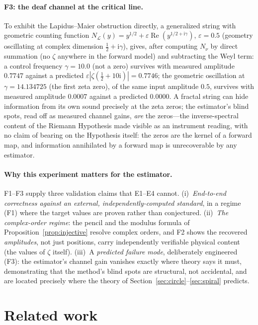 \documentclass[11pt, a4paper]{article}
\theoremstyle{definition}
\theoremstyle{remark}
\newcommand{\ii}{\mathrm{i}}
\begin{document}
\paragraph{F3: the deaf channel at the critical line.} To exhibit the
Lapidus--Maier obstruction directly, a generalized string with geometric
counting function
$N_{\mathcal{L}}(y)=y^{1/2}+\varepsilon\operatorname{Re}(y^{1/2+\ii\gamma})$,
$\varepsilon=0.5$ (geometry oscillating at complex dimension
$\tfrac12+\ii\gamma$), gives, after computing $N_\nu$ by direct summation
(no $\zeta$ anywhere in the forward model) and subtracting the Weyl term: a
control frequency $\gamma=10.0$ (not a zero) survives with measured
amplitude $0.7747$ against a predicted $\varepsilon|\zeta(\tfrac12+10\ii)|
=0.7746$; the geometric oscillation at $\gamma=14.134725$ (the first zeta
zero), of the same input amplitude $0.5$, survives with measured amplitude
$\mathbf{0.0007}$ against a predicted $0.0000$. A fractal string can hide
information from its own sound precisely at the zeta zeros; the
estimator's blind spots, read off as measured channel gains, \emph{are}
the zeros---the inverse-spectral content of the Riemann Hypothesis made
visible as an instrument reading, with no claim of bearing on the
Hypothesis itself: the zeros are the kernel of a forward map, and
information annihilated by a forward map is unrecoverable by any
estimator.

\paragraph{Why this experiment matters for the estimator.} F1--F3 supply
three validation claims that E1--E4 cannot. (i)~\emph{End-to-end
correctness against an external, independently-computed standard}, in a
regime (F1) where the target values are proven rather than conjectured.
(ii)~\emph{The complex-order regime}: the pencil and the modulus formula
of Proposition~\ref{prop:injective} resolve complex orders, and F2 shows
the recovered \emph{amplitudes}, not just positions, carry independently
verifiable physical content (the values of $\zeta$ itself). (iii)~A
\emph{predicted failure mode}, deliberately engineered (F3): the
estimator's channel gain vanishes exactly where theory says it must,
demonstrating that the method's blind spots are structural, not
accidental, and are located precisely where the theory of
Section~\ref{sec:circle}--\ref{sec:spiral} predicts.

\section{Related work}\label{sec:related}
\end{document}
